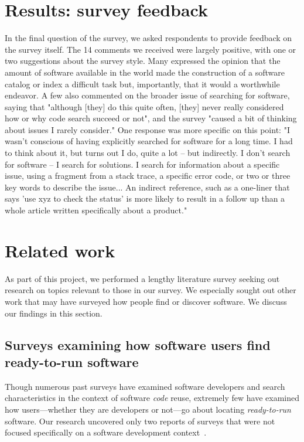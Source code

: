\documentclass{casicswhitepaper}
\begin{document}
\section{Results: survey feedback}

In the final question of the survey, we asked respondents to provide feedback on the survey itself.  The 14 comments we received were largely positive, with one or two suggestions about the survey style. Many expressed the opinion that the amount of software available in the world made the construction of a software catalog or index a difficult task but, importantly, that it would a worthwhile endeavor. A few also commented on the broader issue of searching for software, saying that "although [they] do this quite often, [they] never really considered how or why code search succeed or not", and the survey "caused a bit of thinking about issues I rarely consider." One response was more specific on this point: "I wasn't conscious of having explicitly searched for software for a long time. I had to think about it, but turns out I do, quite a lot -- but indirectly. I don't search for software -- I search for solutions. I search for information about a specific issue, using a fragment from a stack trace, a specific error code, or two or three key words to describe the issue... An indirect reference, such as a one-liner that says 'use xyz to check the status' is more likely to result in a follow up than a whole article written specifically about a product."


\section{Related work}

As part of this project, we performed a lengthy literature survey seeking out research on topics relevant to those in our survey.  We especially sought out other work that may have surveyed how people find or discover software.  We discuss our findings in this section.


\subsection{Surveys examining how software users find ready-to-run software}

Though numerous past surveys have examined software developers and search characteristics in the context of software \emph{code} reuse, extremely few have examined how users---whether they are developers or not---go about locating \emph{ready-to-run} software.  Our research uncovered only two reports of surveys that were not focused specifically on a software development context~\cite{joppa2013troubling, huang2013provenance}.
\end{document}
